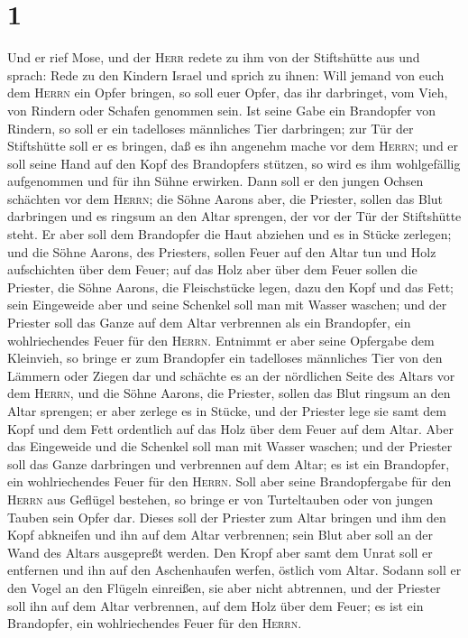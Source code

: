 \hypertarget{section}{%
\section{1}\label{section}}

 Und er rief Mose, und der \textsc{Herr} redete zu ihm von
der Stiftshütte aus und sprach:  Rede zu den Kindern
Israel und sprich zu ihnen: Will jemand von euch dem \textsc{Herrn} ein
Opfer bringen, so soll euer Opfer, das ihr darbringet, vom Vieh, von
Rindern oder Schafen genommen sein.  Ist seine Gabe ein
Brandopfer von Rindern, so soll er ein tadelloses männliches Tier
darbringen; zur Tür der Stiftshütte soll er es bringen, daß es ihn
angenehm mache vor dem \textsc{Herrn};  und er soll seine
Hand auf den Kopf des Brandopfers stützen, so wird es ihm wohlgefällig
aufgenommen und für ihn Sühne erwirken.  Dann soll er den
jungen Ochsen schächten vor dem \textsc{Herrn}; die Söhne Aarons aber,
die Priester, sollen das Blut darbringen und es ringsum an den Altar
sprengen, der vor der Tür der Stiftshütte steht.  Er aber
soll dem Brandopfer die Haut abziehen und es in Stücke zerlegen;
 und die Söhne Aarons, des Priesters, sollen Feuer auf den
Altar tun und Holz aufschichten über dem Feuer;  auf das
Holz aber über dem Feuer sollen die Priester, die Söhne Aarons, die
Fleischstücke legen, dazu den Kopf und das Fett;  sein
Eingeweide aber und seine Schenkel soll man mit Wasser waschen; und der
Priester soll das Ganze auf dem Altar verbrennen als ein Brandopfer, ein
wohlriechendes Feuer für den \textsc{Herrn}.  Entnimmt er
aber seine Opfergabe dem Kleinvieh, so bringe er zum Brandopfer ein
tadelloses männliches Tier von den Lämmern oder Ziegen dar
 und schächte es an der nördlichen Seite des Altars vor
dem \textsc{Herrn}, und die Söhne Aarons, die Priester, sollen das Blut
ringsum an den Altar sprengen;  er aber zerlege es in
Stücke, und der Priester lege sie samt dem Kopf und dem Fett ordentlich
auf das Holz über dem Feuer auf dem Altar.  Aber das
Eingeweide und die Schenkel soll man mit Wasser waschen; und der
Priester soll das Ganze darbringen und verbrennen auf dem Altar; es ist
ein Brandopfer, ein wohlriechendes Feuer für den \textsc{Herrn}.
 Soll aber seine Brandopfergabe für den \textsc{Herrn}
aus Geflügel bestehen, so bringe er von Turteltauben oder von jungen
Tauben sein Opfer dar.  Dieses soll der Priester zum
Altar bringen und ihm den Kopf abkneifen und ihn auf dem Altar
verbrennen; sein Blut aber soll an der Wand des Altars ausgepreßt
werden.  Den Kropf aber samt dem Unrat soll er entfernen
und ihn auf den Aschenhaufen werfen, östlich vom Altar. 
Sodann soll er den Vogel an den Flügeln einreißen, sie aber nicht
abtrennen, und der Priester soll ihn auf dem Altar verbrennen, auf dem
Holz über dem Feuer; es ist ein Brandopfer, ein wohlriechendes Feuer für
den \textsc{Herrn}.

